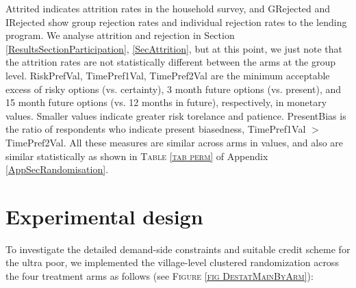 	\textsf{Attrited} indicates attrition rates in the household survey, and \textsf{GRejected} and \textsf{IRejected} show group rejection rates and individual rejection rates to the lending program. We analyse attrition and rejection in Section \ref{ResultsSectionParticipation}, \ref{SecAttrition}, but at this point, we just note that the attrition rates are not statistically different between the arms at the group level. \textsf{RiskPrefVal, TimePref1Val, TimePref2Val} are the minimum acceptable excess of risky options (vs. certainty), 3 month future options (vs. present), and 15 month future options (vs. 12 months in future), respectively, in monetary values. \label{StudySamplePrefDescription} Smaller values indicate greater risk torelance and patience. \textsf{PresentBias} is the ratio of respondents who indicate present biasedness, \textsf{TimePref1Val} $>$ \textsf{TimePref2Val}. All these measures are similar across arms in values, and also are similar statistically as shown in \textsc{\normalsize Table \ref{tab perm}} of Appendix \ref{AppSecRandomisation}.


\section{Experimental design}
\label{SecExperimentalDesign}


	To investigate the detailed demand-side constraints and suitable credit scheme for the ultra poor, we implemented the village-level clustered randomization across the four treatment arms as follows (see \textsc{\normalsize Figure \ref{fig DestatMainByArm}}):

